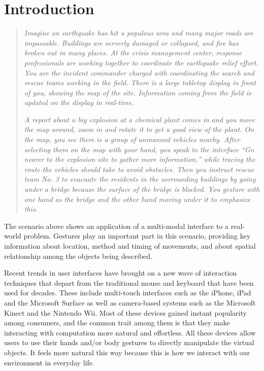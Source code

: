 \section{Introduction}
\begin{quotation}
\textit{Imagine an earthquake has hit a populous area and many major roads are
impassable. Buildings are serverly damaged or collapsed, and fire has broken out
in many places. At the crisis management center, response professionals are
working together to coordinate the earthquake relief effort. You are the
incident commander charged with coordinating the search
and rescue teams working in the field. There is a large tabletop display in
front of you, showing the map of the site. Information coming from the field is
updated on the display in real-time.}

\textit{A report about a big explosion at a chemical plant comes in and you move
the map around, zoom in and rotate it to get a good view of the plant. On the
map, you see there is a group of unmanned vehicles nearby. After selecting them
on the map with your hand, you speak to the interface ``Go nearer to the
explosion site to gather more information,'' while tracing the route the
vehicles should take to avoid obstacles. Then you instruct rescue team No. 3 to evacuate the residents
in the sorrounding buildings by going under a bridge because the surface of the
bridge is blocked. You gesture with one hand as the bridge and the other
hand moving under it to emphasize this.}
\end{quotation}

The scenario above shows an application of a multi-modal interface to a
real-world problem. Gestures play an important part in this scenario,
providing key information about location, method and timing of movements,
and about spatial relationship among the objects being described.

Recent trends in user interfaces have brought on a new wave of interaction
techniques that depart from the traditional mouse and keyboard that have been 
used for decades. These include multi-touch interfaces such as the 
iPhone\textsuperscript{\textregistered}, iPad and the Microsoft 
Surface\textsuperscript{\textregistered} as well as camera-based systems such as
the Microsoft Kinect and the Nintendo\textsuperscript{\textregistered} Wii. Most
of these devices gained instant popularity among consumers, and the common trait
among them is that they make interacting with computation more natural and 
effortless. All these devices allow users to use their hands and/or body 
gestures to directly manipulate the virtual objects. It feels more natural this 
way because this is how we interact with our environment in everyday life.
 

